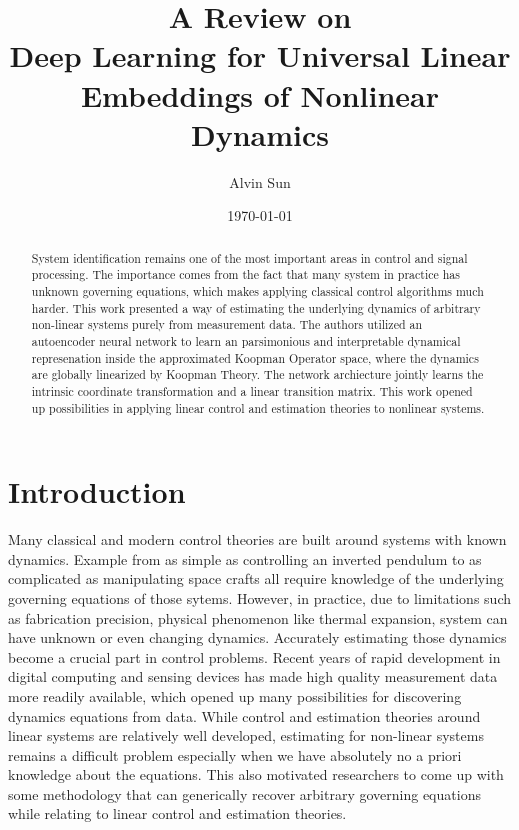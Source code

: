 \documentclass[12pt]{article}
\title{A Review on \\
  Deep Learning for Universal Linear Embeddings of Nonlinear Dynamics \cite{lusch2018deep}}
\author{Alvin Sun}
\date{\today}
\begin{document}
\maketitle

\begin{abstract}
  System identification remains one of the most important areas in control and
  signal processing. The importance comes from the fact that many system in practice
  has unknown governing equations, which makes applying classical control algorithms
  much harder. This work presented a way of estimating the underlying dynamics
  of arbitrary non-linear systems purely from measurement data. The authors utilized an
  autoencoder neural network to learn an parsimonious and interpretable dynamical
  represenation inside the approximated Koopman Operator space, where the dynamics
  are globally linearized by Koopman Theory. The network archiecture jointly
  learns the intrinsic coordinate transformation and a linear transition matrix.
  This work opened up possibilities in applying linear control and estimation
  theories to nonlinear systems.
\end{abstract}

\section{Introduction}

Many classical and modern control theories are built around systems with known dynamics.
Example from as simple as controlling an inverted pendulum to as complicated
as manipulating space crafts all require knowledge of the underlying governing equations
of those sytems. However, in practice, due to limitations such as fabrication precision,
physical phenomenon like thermal expansion, system can have unknown or even changing
dynamics. Accurately estimating those dynamics become a crucial part in control problems.
Recent years of rapid development in digital computing and sensing devices has made high
quality measurement data more readily available, which opened up many possibilities for
discovering dynamics equations from data. While control and estimation theories around
linear systems are relatively well developed, estimating for non-linear systems remains
a difficult problem especially when we have absolutely no a priori knowledge about the equations.
This also motivated researchers to come up with some methodology that can generically
recover arbitrary governing equations while relating to linear control and estimation theories.
\end{document}

